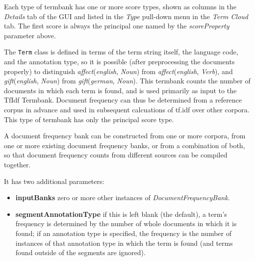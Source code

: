 Each type of termbank has one or more score types, shown as columns in the
\emph{Details} tab of the GUI and listed in the \emph{Type} pull-down menu in
the \emph{Term Cloud} tab.  The first score is always the principal one named by
the \emph{scoreProperty} parameter above.


The \texttt{Term} class is defined in terms of the term string itself, the
language code, and the annotation type, so it is possible (after preprocessing
the documents properly) to distinguish \emph{affect}(\emph{english}, \emph{Noun})
from \emph{affect}(\emph{english}, \emph{Verb}), and
\emph{gift}(\emph{english}, \emph{Noun}) from
\emph{gift}(\emph{german}, \emph{Noun}).
This termbank counts the number of documents in which each term is found, and is
used primarily as input to the TfIdf Termbank.  Document frequency can thus be
determined from a reference corpus in advance and used in subsequent calcuations
of tf.idf over other corpora.  This type of termbank has only the principal
score type.


A document frequency bank can be constructed from one or more corpora, from one
or more existing document frequency banks, or from a combination of both, so
that document frequency counts from different sources can be compiled together.

It has two additional parameters:
\begin{itemize}
\item \textbf{inputBanks} zero or more other instances of
  \emph{DocumentFrequencyBank}.
\item \textbf{segmentAnnotationType} if this is left blank (the default), a
  term's frequency is determined by the number of whole documents in which it is
  found; if an annotation type is specified, the frequency is the number of
  instances of that annotation type in which the term is found (and terms found
  outside of the segments are ignored).
\end{itemize}




